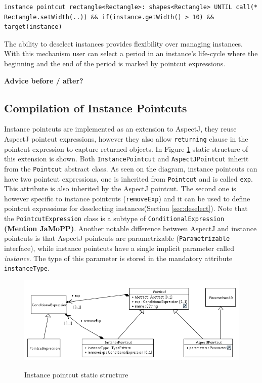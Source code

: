 \documentclass{llncs}
\begin{document}
\begin{lstlisting}[float=h!]
instance pointcut rectangle<Rectangle>: shapes<Rectangle> UNTIL call(* Rectangle.setWidth(..)) && if(instance.getWidth() > 10) && target(instance)
\end{lstlisting}

The ability to deselect instances provides flexibility over managing instances. With this mechanism user can select a period in an instance's life-cycle where the beginning and the end of the period is marked by pointcut expressions.

\textbf{\textcolor[rgb]{1,0.41,0.13}{Advice before / after?}}

\subsection{Compilation of Instance Pointcuts}

Instance pointcuts are implemented as an extension to AspectJ, they reuse AspectJ pointcut expressions, however they also allow \texttt{returning} clause in the pointcut expression to capture returned objects. In Figure \ref{fig:ip} static structure of this extension is shown. Both \texttt{InstancePointcut} and \texttt{AspectJPointcut} inherit from the \texttt{Pointcut} abstract class. As seen on the diagram, instance pointcuts can have two pointcut expressions, one is inherited from \texttt{Pointcut} and is called \texttt{exp}. This attribute is also inherited by the AspectJ pointcut. The second one is however specific to instance pointcuts (\texttt{removeExp}) and it can be used to define pointcut expressions for deselecting instances(Section \ref{sec:deselect}). Note that the \texttt{PointcutExpression} class is a subtype of \texttt{ConditionalExpression} \textbf{\textcolor[rgb]{1,0.41,0.13}{(Mention JaMoPP)}}. Another notable difference between AspectJ and instance pointcuts is that AspectJ pointcuts are parametrizable (\texttt{Parametrizable} interface), while instance pointcuts have a single implicit parameter called \emph{instance}. The type of this parameter is stored in the mandatory attribute \texttt{instanceType}.

\begin{figure}
\centering
   \includegraphics[width=\textwidth] {images/pc.png}
   \label{fig:shapes}
\label{fig:ip}
\caption{Instance pointcut static structure}
\end{figure}
\end{document}

